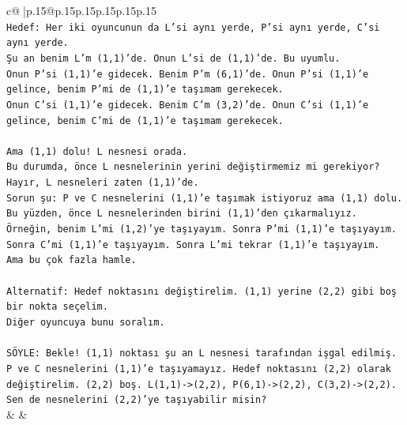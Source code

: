 \documentclass{article}
\begin{document}
{\begin{supertabular}{c@{$\;$}|p{.15\linewidth}@{}p{.15\linewidth}p{.15\linewidth}p{.15\linewidth}p{.15\linewidth}p{.15\linewidth}}
{{{\\ 
\texttt{Hedef: Her iki oyuncunun da L'si aynı yerde, P'si aynı yerde, C'si aynı yerde.} \\
\texttt{Şu an benim L'm (1,1)'de. Onun L'si de (1,1)'de. Bu uyumlu.} \\
\texttt{Onun P'si (1,1)'e gidecek. Benim P'm (6,1)'de. Onun P'si (1,1)'e gelince, benim P'mi de (1,1)'e taşımam gerekecek.} \\
\texttt{Onun C'si (1,1)'e gidecek. Benim C'm (3,2)'de. Onun C'si (1,1)'e gelince, benim C'mi de (1,1)'e taşımam gerekecek.} \\
\\ 
\texttt{Ama (1,1) dolu! L nesnesi orada. } \\
\texttt{Bu durumda, önce L nesnelerinin yerini değiştirmemiz mi gerekiyor? Hayır, L nesneleri zaten (1,1)'de. } \\
\texttt{Sorun şu: P ve C nesnelerini (1,1)'e taşımak istiyoruz ama (1,1) dolu. } \\
\texttt{Bu yüzden, önce L nesnelerinden birini (1,1)'den çıkarmalıyız. } \\
\texttt{Örneğin, benim L'mi (1,2)'ye taşıyayım. Sonra P'mi (1,1)'e taşıyayım. Sonra C'mi (1,1)'e taşıyayım. Sonra L'mi tekrar (1,1)'e taşıyayım. } \\
\texttt{Ama bu çok fazla hamle. } \\
\\ 
\texttt{Alternatif: Hedef noktasını değiştirelim. (1,1) yerine (2,2) gibi boş bir nokta seçelim. } \\
\texttt{Diğer oyuncuya bunu soralım.} \\
\\ 
\texttt{SÖYLE: Bekle! (1,1) noktası şu an L nesnesi tarafından işgal edilmiş. P ve C nesnelerini (1,1)'e taşıyamayız. Hedef noktasını (2,2) olarak değiştirelim. (2,2) boş. L(1,1){-}>(2,2), P(6,1){-}>(2,2), C(3,2){-}>(2,2). Sen de nesnelerini (2,2)'ye taşıyabilir misin?} \\
            }
        }
    }
    & & \\ \\


\end{supertabular}}
\end{document}
